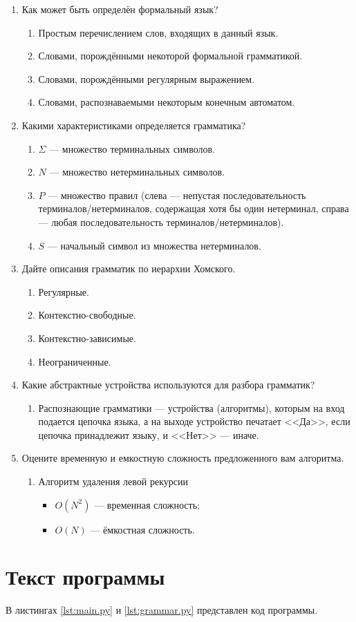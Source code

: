 \documentclass[a4paper]{bmstu}
\begin{document}
\begin{enumerate}
    \item Как может быть определён формальный язык?
    \begin{enumerate}
        \item Простым перечислением слов, входящих в данный язык.
        \item Словами, порождёнными некоторой формальной грамматикой.
        \item Словами, порождёнными регулярным выражением.
        \item Словами, распознаваемыми некоторым конечным автоматом.
    \end{enumerate}
    \item Какими характеристиками определяется грамматика?
    \begin{enumerate}
        \item $\Sigma$ --- множество терминальных символов.
        \item $N$ --- множество нетерминальных символов.
        \item $P$ --- множество правил (слева --- непустая последовательность терминалов/нетерминалов, содержащая хотя бы один нетерминал, справа --- любая последовательность терминалов/нетерминалов).
        \item $S$ --- начальный символ из множества нетерминалов.
    \end{enumerate}
    \item Дайте описания грамматик по иерархии Хомского.
    \begin{enumerate}
        \item Регулярные.
        \item Контекстно-свободные.
        \item Контекстно-зависимые.
        \item Неограниченные.
    \end{enumerate}
    \item Какие абстрактные устройства используются для разбора грамматик?
    \begin{enumerate}
        \item Распознающие грамматики --- устройства (алгоритмы), которым на вход подается цепочка языка, а на выходе устройство печатает <<Да>>, если цепочка принадлежит языку, и <<Нет>> --- иначе.
    \end{enumerate}
    \item Оцените временную и емкостную сложность предложенного вам алгоритма.
    \begin{enumerate}
        \item Алгоритм удаления левой рекурсии
        \begin{itemize}
            \item $O(N^2)$ --- временная сложность;
            \item $O(N)$ --- ёмкостная сложность.
        \end{itemize}
    \end{enumerate}
\end{enumerate}


\chapter{Текст программы}

В листингах \ref{lst:main.py} и \ref{lst:grammar.py} представлен код программы.


\end{document}
